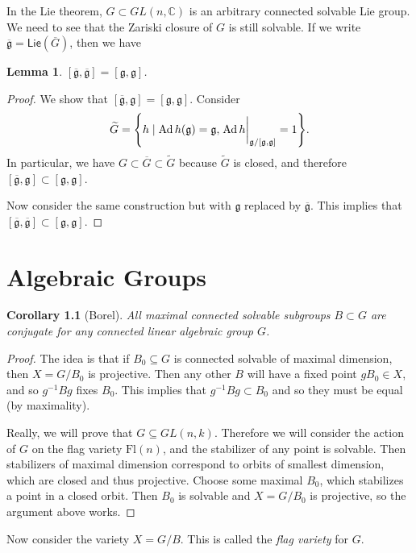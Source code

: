 \documentclass[leqno, openany]{memoir}
\newtheorem{cor}[thm]{Corollary}
\newtheorem{lem}[thm]{Lemma}
\theoremstyle{definition}
\theoremstyle{remark}
\theoremstyle{plain}
\theoremstyle{definition}
\theoremstyle{remark}
\newcommand{\C}{\mathbb{C}}
\newcommand{\mf}[1]{\mathfrak{#1}}
\newcommand{\mr}[1]{\mathrm{#1}}
\newcommand{\ms}[1]{\mathsf{#1}}
\newcommand{\ol}[1]{\overline{#1}}
\newcommand{\wtl}[1]{\widetilde{#1}}
\DeclareMathOperator{\Ad}{Ad}
\begin{document}
In the Lie theorem, $G \subset GL(n, \C)$ is an arbitrary connected solvable Lie group. We need to see that the Zariski closure of $G$ is still solvable. If we write $\ol{\mf{g}} = \ms{Lie}(\ol{G})$, then we have

\begin{lem}
    $[\ol{\mf{g}}, \ol{\mf{g}}] = [\mf{g}, \mf{g}]$. 
\end{lem}

\begin{proof}
    We show that $[\ol{\mf{g}}, \mf{g}] = [\mf{g}, \mf{g}]$. Consider 
    \[ \wtl{G} = \qty{h \mid \Ad h (\mf{g}) = \mf{g}, \eval{\Ad h}_{\mf{g} / [\mf{g}, \mf{g}]} = 1}. \] 
    In particular, we have $G \subset \ol{G} \subset \wtl{G}$ because $\wtl{G}$ is closed, and therefore $[\ol{\mf{g}}, \mf{g}] \subset [\mf{g}, \mf{g}]$.

    Now consider the same construction but with $\mf{g}$ replaced by $\ol{\mf{g}}$. This implies that $[\ol{\mf{g}}, \ol{\mf{g}}] \subset [\mf{g}, \mf{g}]$.
\end{proof}

\chapter{Algebraic Groups}%
\label{cha:algebraic_group}

\begin{cor}[Borel]
    All maximal connected solvable subgroups $B \subset G$ are conjugate for any connected linear algebraic group $G$.
\end{cor}

\begin{proof}
    The idea is that if $B_0 \subseteq G$ is connected solvable of maximal dimension, then $X = G/B_0$ is projective. Then any other $B$ will have a fixed point $g B_0 \in X$, and so $g^{-1} B g$ fixes $B_0$. This implies that $g^{-1}Bg \subset B_0$ and so they must be equal (by maximality).

    Really, we will prove that $G \subseteq GL(n, k)$. Therefore we will consider the action of $G$ on the flag variety $\mr{Fl}(n)$, and the stabilizer of any point is solvable. Then stabilizers of maximal dimension correspond to orbits of smallest dimension, which are closed and thus projective. Choose some maximal $B_0$, which stabilizes a point in a closed orbit. Then $B_0$ is solvable and $X = G/B_0$ is projective, so the argument above works.
\end{proof}

Now consider the variety $X = G/B$. This is called the \textit{flag variety} for $G$.
\end{document}
